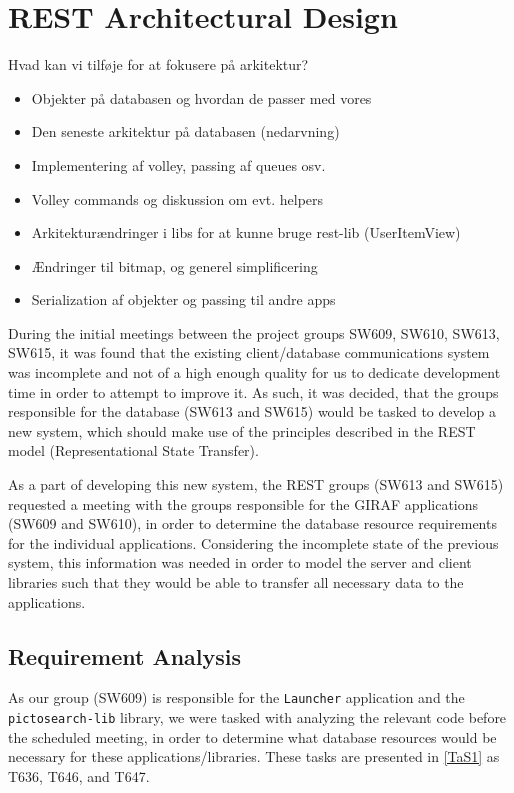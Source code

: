 \chapter{REST Architectural Design}\label{S1CS}
Hvad kan vi tilføje for at fokusere på arkitektur?
\begin{itemize}
  \item Objekter på databasen og hvordan de passer med vores
  \item Den seneste arkitektur på databasen (nedarvning)
  \item Implementering af volley, passing af queues osv.
  \item Volley commands og diskussion om evt. helpers
  \item Arkitekturændringer i libs for at kunne bruge rest-lib (UserItemView)
  \item Ændringer til bitmap, og generel simplificering
  \item Serialization af objekter og passing til andre apps
\end{itemize}

During the initial meetings between the project groups SW609, SW610, SW613,
SW615, it was found that the existing client/database communications system was
incomplete and not of a high enough quality for us to dedicate development time
in order to attempt to improve it. As such, it was decided, that the groups
responsible for the database (SW613 and SW615) would be tasked to develop a new
system, which should make use of the principles described in the REST model
(Representational State Transfer).\nl

As a part of developing this new system, the REST groups (SW613 and SW615)
requested a meeting with the groups responsible for the GIRAF applications
(SW609 and SW610), in order to determine the database resource requirements for the
individual applications. Considering the incomplete state of the previous
system, this information was needed in order to model the server and client
libraries such that they would be able to transfer all necessary data to the
applications.\nl

\section{Requirement Analysis}
As our group (SW609) is responsible for the \texttt{Launcher} application and
the \texttt{pictosearch-lib} library, we were tasked with analyzing the relevant
code before the scheduled meeting, in order to determine what database resources
would be necessary for these applications/libraries. These tasks are presented
in \autoref{TaS1} as T636, T646, and T647.\nl

